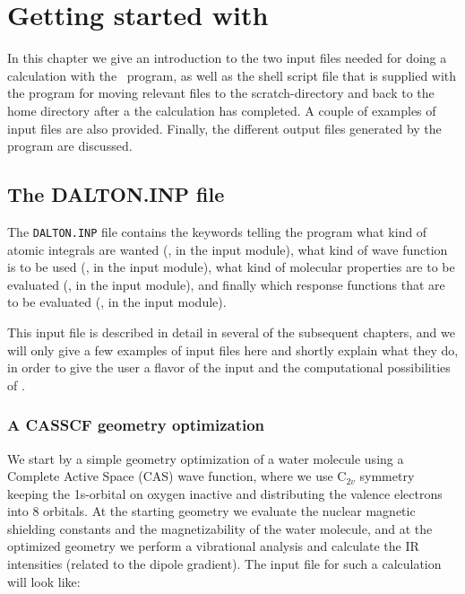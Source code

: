 \chapter{Getting started with \siraba }\label{ch:starting}

In this chapter we give an introduction to the two input files needed
for doing a calculation with the \siraba\ program, as well as the
shell script file that is supplied with the program for moving
relevant files to the scratch-directory and back to the home directory
after a the calculation has completed. A couple of examples of
input files  are also provided. Finally, the different output files
generated by the program are discussed.

\section{The DALTON.INP file}\label{sec:daltoninp}

The \verb|DALTON.INP| file contains the keywords telling the program
what kind of atomic integrals are wanted (\her , in the
 input module), what kind of wave
function is to be used (\sir , in the  input
module), what kind of molecular properties  are
to be evaluated (\aba , in the  input module), and
finally which response functions that are to
be evaluated (\resp , in
the  input module).

This input file is described in detail in several of the subsequent chapters,
and we will  only give a few examples of input files here and shortly
explain what they do, in order to give the user a flavor of the input
and the computational possibilities
of \siraba .

\subsection{A CASSCF geometry optimization}

We start by a simple geometry optimization of a water molecule using a Complete
Active Space (CAS) wave function, where we use C$_{2v}$ symmetry
keeping the 1s-orbital on oxygen inactive and distributing the valence
electrons  into 8 orbitals. At the starting geometry we
evaluate the nuclear magnetic shielding constants and the
magnetizability of the water
molecule, and at the optimized geometry we perform a vibrational
analysis and calculate the IR
intensities (related to the dipole
gradient). The input file for such a calculation will look like:

